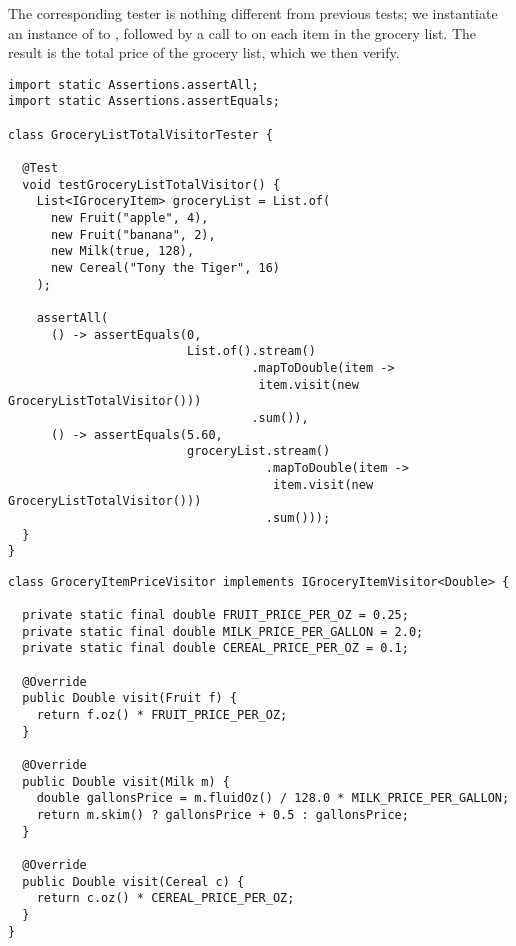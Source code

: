The corresponding tester is nothing different from previous tests; we instantiate an instance of  to , followed by a call to  on each item in the grocery list. The result is the total price of the grocery list, which we then verify.

\begin{cl}[]{}
\begin{lstlisting}[language=MyJava]
import static Assertions.assertAll;
import static Assertions.assertEquals;

class GroceryListTotalVisitorTester {

  @Test
  void testGroceryListTotalVisitor() {
    List<IGroceryItem> groceryList = List.of(
      new Fruit("apple", 4),
      new Fruit("banana", 2),
      new Milk(true, 128),
      new Cereal("Tony the Tiger", 16)
    );

    assertAll(
      () -> assertEquals(0, 
                         List.of().stream()
                                  .mapToDouble(item -> 
                                   item.visit(new GroceryListTotalVisitor()))
                                  .sum()),
      () -> assertEquals(5.60, 
                         groceryList.stream()
                                    .mapToDouble(item -> 
                                     item.visit(new GroceryListTotalVisitor()))
                                    .sum()));
  }
}
\end{lstlisting}
\end{cl}

\begin{cl}[]{}
\begin{lstlisting}[language=MyJava]
class GroceryItemPriceVisitor implements IGroceryItemVisitor<Double> {

  private static final double FRUIT_PRICE_PER_OZ = 0.25;
  private static final double MILK_PRICE_PER_GALLON = 2.0;
  private static final double CEREAL_PRICE_PER_OZ = 0.1;

  @Override
  public Double visit(Fruit f) {
    return f.oz() * FRUIT_PRICE_PER_OZ;
  }

  @Override
  public Double visit(Milk m) {
    double gallonsPrice = m.fluidOz() / 128.0 * MILK_PRICE_PER_GALLON;
    return m.skim() ? gallonsPrice + 0.5 : gallonsPrice;
  }

  @Override
  public Double visit(Cereal c) {
    return c.oz() * CEREAL_PRICE_PER_OZ;
  }
}
\end{lstlisting}
\end{cl}
